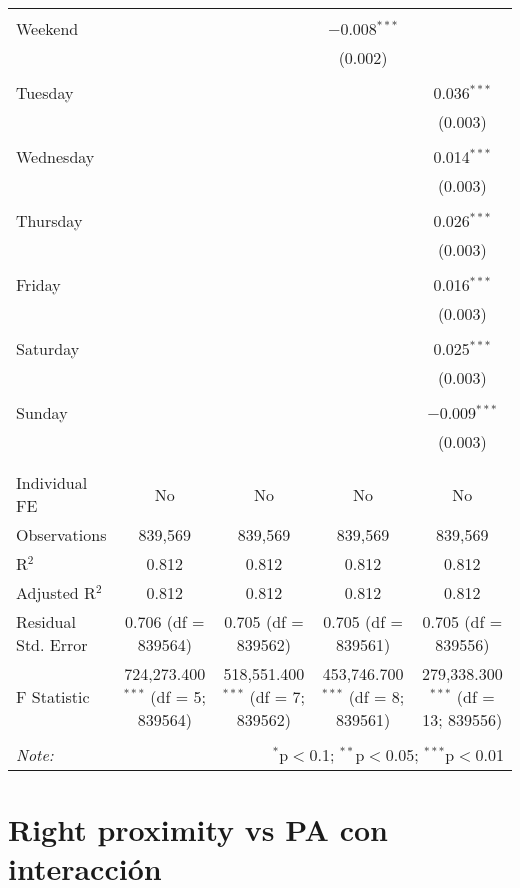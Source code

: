 \documentclass[
]{article}
\begin{document}
\begin{table}[!htbp]
{\begin{tabular}{@{\extracolsep{5pt}}lcccc}
  & & & & \\ 
 Weekend &  &  & $-$0.008$^{***}$ &  \\ 
  &  &  & (0.002) &  \\ 
  & & & & \\ 
 Tuesday &  &  &  & 0.036$^{***}$ \\ 
  &  &  &  & (0.003) \\ 
  & & & & \\ 
 Wednesday &  &  &  & 0.014$^{***}$ \\ 
  &  &  &  & (0.003) \\ 
  & & & & \\ 
 Thursday &  &  &  & 0.026$^{***}$ \\ 
  &  &  &  & (0.003) \\ 
  & & & & \\ 
 Friday &  &  &  & 0.016$^{***}$ \\ 
  &  &  &  & (0.003) \\ 
  & & & & \\ 
 Saturday &  &  &  & 0.025$^{***}$ \\ 
  &  &  &  & (0.003) \\ 
  & & & & \\ 
 Sunday &  &  &  & $-$0.009$^{***}$ \\ 
  &  &  &  & (0.003) \\ 
  & & & & \\ 
\hline \\[-1.8ex] 
Individual FE & No & No & No & No \\ 
Observations & 839,569 & 839,569 & 839,569 & 839,569 \\ 
R$^{2}$ & 0.812 & 0.812 & 0.812 & 0.812 \\ 
Adjusted R$^{2}$ & 0.812 & 0.812 & 0.812 & 0.812 \\ 
Residual Std. Error & 0.706 (df = 839564) & 0.705 (df = 839562) & 0.705 (df = 839561) & 0.705 (df = 839556) \\ 
F Statistic & 724,273.400$^{***}$ (df = 5; 839564) & 518,551.400$^{***}$ (df = 7; 839562) & 453,746.700$^{***}$ (df = 8; 839561) & 279,338.300$^{***}$ (df = 13; 839556) \\ 
\hline 
\hline \\[-1.8ex] 
\textit{Note:}  & \multicolumn{4}{r}{$^{*}$p$<$0.1; $^{**}$p$<$0.05; $^{***}$p$<$0.01} \\ 
\end{tabular}
} 
\end{table} 
\newpage
\section{Right proximity vs PA con interacción}
\end{document}
